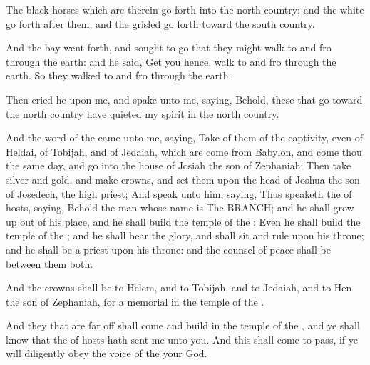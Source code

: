 \Verse The black horses which are therein go forth into the north country; and the white go forth after them; and the grisled go forth toward the south country.

\Verse And the bay went forth, and sought to go that they might walk to and fro through the earth: and he said, Get you hence, walk to and fro through the earth. So they walked to and fro through the earth.

\Verse Then cried he upon me, and spake unto me, saying, Behold, these that go toward the north country have quieted my spirit in the north country.

\Verse And the word of the \LORD came unto me, saying, \Verse Take of them of the captivity, even of Heldai, of Tobijah, and of Jedaiah, which are come from Babylon, and come thou the same day, and go into the house of Josiah the son of Zephaniah; \Verse Then take silver and gold, and make crowns, and set them upon the head of Joshua the son of Josedech, the high priest; \Verse And speak unto him, saying, Thus speaketh the \LORD of hosts, saying, Behold the man whose name is The BRANCH; and he shall grow up out of his place, and he shall build the temple of the \LORD: \Verse Even he shall build the temple of the \LORD; and he shall bear the glory, and shall sit and rule upon his throne; and he shall be a priest upon his throne: and the counsel of peace shall be between them both.

\Verse And the crowns shall be to Helem, and to Tobijah, and to Jedaiah, and to Hen the son of Zephaniah, for a memorial in the temple of the \LORD.

\Verse And they that are far off shall come and build in the temple of the \LORD, and ye shall know that the \LORD of hosts hath sent me unto you. And this shall come to pass, if ye will diligently obey the voice of the \LORD your God.


